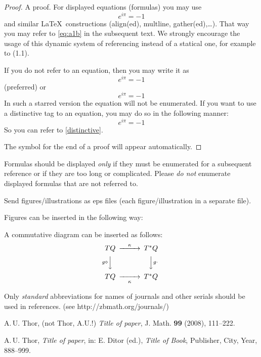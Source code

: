 \documentclass[a4paper,draft]{amsproc}
\theoremstyle{plain}
\theoremstyle{definition}
\theoremstyle{remark}
\numberwithin{equation}{section}
\begin{document}
\begin{proof}
A proof. For displayed equations (formulas) you may use
\begin{equation}\label{eq:a1b}
e^{i\pi}=-1
\end{equation}
and similar \LaTeX\ constructions (align(ed), multline, gather(ed),\dots).
That way you may refer to \eqref{eq:a1b} in the subsequent text.
We strongly encourage the usage of this dynamic system of referencing
instead of a statical one, for example to (1.1).

If you do not refer to an equation, then you may write it as
\[
e^{i\pi}=-1
\]
(preferred) or
\begin{equation*}
e^{i\pi}=-1
\end{equation*}
In such a starred version the equation will not be enumerated.
If you want to use a distinctive tag to an equation,
you may do so in the following manner:
\begin{equation}\label{distinctive}
e^{i\pi}=-1
\tag{$*$}
\end{equation}
So you can refer to \eqref{distinctive}.

The symbol for the end of a proof will appear automatically.
\end{proof}

Formulas should be displayed \emph{only}
if they must be enumerated for a subsequent reference
or if they are too long or complicated.
Please \emph{do not} enumerate displayed formulas that are not referred to.

Send figures/illustrations as eps files (each figure/illustration in a separate file).

Figures can be inserted in the following way:

\begin{figure}[htb]
\caption{}
\label{some label}
\end{figure}

A commutative diagram can be inserted as follows:
\[
\begin{CD}
TQ @>{\kappa}>> T^*Q \\
@V{g\diamond}VV  @VV{g\cdot}V \\
TQ @>>{\kappa}> T^*Q \\
\end{CD}
\]

Only \emph{standard} abbreviations for names of journals and other serials 
should be used in references. (see http://zbmath.org/journals/)



\begin{thebibliography}{n} %

\label{some label - optional} A.\,U. Thor, (not Thor, A.U.!)
\emph{Title of paper},
J. Math. \textbf{99} (2008), 111--222.

 A.\,U. Thor,
\emph{Title of paper},
in: E. Ditor (ed.), \emph{Title of Book}, Publisher, City, Year, 888--999.

\end{thebibliography}
\end{document}
